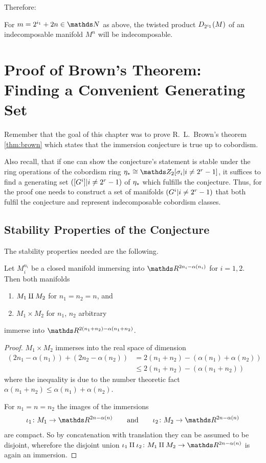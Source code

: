 Therefore:
\begin{Cor}\label{cor:twistedprod:indecompcriterion}
  For $m=2^{i_1}+2n\in\Nat$ as above, the twisted product
  $D_{2^{i_1}}({M})$ of an indecomposable manifold $M^n$ will be
  indecomposable.
\end{Cor}


\section
{Proof of Brown's Theorem: Finding a Convenient Generating Set}
\label{sec:proofbrown}
Remember that the goal of this chapter was to prove R.~L.~Brown's
theorem \ref{thm:brown} which states that the immersion conjecture is
true up to cobordism.

Also recall, that if one can show the conjecture's statement is stable
under the ring operations of the cobordism ring
$\c_*\cong\Zmod2[\sigma_i|i\neq2^r-1]$, it suffices to find a
generating set $([G^{i}]|i\neq2^r-1)$ of $\eta_*$ which fulfills the conjecture.
Thus, for the proof one needs to construct a set of manifolds
$(G^{i}|i\neq2^r-1)$ that both fulfil the conjecture and represent
indecomposable cobordism classes.

\subsection{Stability Properties of the Conjecture}
The stability properties needed are the following.
\begin{Lem}\label{lem:brownstableunderringops}
  Let $M_i^{n_i}$ be a closed manifold immersing into
  $\R^{2n_i-\alpha(n_i)}$ for $i=1,2$.
  Then both manifolds
  \begin{enumerate}
  \item $M_1\amalg M_2$ for $n_1=n_2=n$, and
  \item $M_1\times M_2$ for $n_1$, $n_2$ arbitrary
  \end{enumerate}
  immerse into $\R^{2(n_1+n_2)-\alpha(n_1+n_2)}$.
  \begin{proof}
    $M_1\times M_2$ immerses into the real space of dimension
    \begin{align*}
      \left( 2n_1-\alpha(n_1) \right)
      + \left( 2n_2-\alpha(n_2) \right)
      &= 2(n_1+n_2) - \left(\alpha(n_1)+\alpha(n_2)\right)\\
      &\leq 2(n_1+n_2) - \left(\alpha(n_1 + n_2)\right)
    \end{align*}
    where the inequality is due to the number theoretic fact
    $\alpha(n_1+n_2) \leq \alpha(n_1)+\alpha(n_2)$.

    For $n_1=n=n_2$ the images of the immersions
    \begin{gather*}
      \iota_1\colon M_1\to\R^{2n-\alpha(n)}
      \qquad \text{and} \qquad
      \iota_2\colon M_2\to\R^{2n-\alpha(n)}
    \end{gather*}
    are compact. So by
    concatenation with translation they can be assumed to be disjoint,
    wherefore the disjoint union
    $\iota_1\disjointsum\iota_2\colon M_1\disjointsum M_2\to\R^{2n-\alpha(n)}$
    is again an immersion.
  \end{proof}
\end{Lem}


